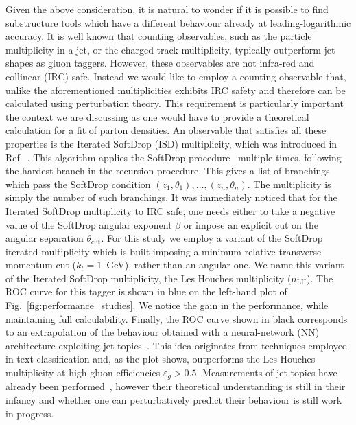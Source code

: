 Given the above consideration, it is natural to wonder if it is possible to find substructure tools
which have a different behaviour already at leading-logarithmic
accuracy.
%
It is well known that counting observables, such as the particle multiplicity in a jet, or the charged-track multiplicity, typically outperform jet shapes as gluon taggers. However, these observables are not infra-red and collinear (IRC) safe. Instead we would like to employ  a counting observable that, unlike the aforementioned multiplicities exhibits IRC safety and therefore can be calculated using perturbation theory. This requirement is particularly important the context we are discussing as one would have to provide a theoretical calculation for a fit of parton densities. 
%
An observable that satisfies all these properties is the Iterated SoftDrop (ISD) multiplicity, which was introduced in Ref.~\cite{Frye:2017yrw}.
%
This algorithm applies the SoftDrop procedure~\cite{Larkoski:2014wba} multiple
times, following the hardest branch in
the recursion procedure. This gives a list of
branchings which pass the SoftDrop condition
$(z_1,\theta_1), \dots, (z_n,\theta_n)$. The multiplicity is simply the number of such branchings.
%
It was immediately noticed that for the Iterated SoftDrop multiplicity to IRC safe, one needs either to take a negative value of the SoftDrop angular exponent $\beta$ or impose an explicit cut on the angular separation  $\theta_\text{cut}$.
%
For this study we employ a variant of the SoftDrop iterated multiplicity which is built imposing a minimum relative transverse momentum cut ($k_t=1$~GeV), rather than an angular one. We name this variant of the Iterated SoftDrop multiplicity, the Les Houches multiplicity ($n_\text{LH}$).
The ROC curve for this tagger is shown in blue on the left-hand plot of  Fig.~\ref{fig:performance_studies}. We notice the gain in the performance, while maintaining full calculability. 
%
Finally, the ROC curve shown in black corresponds to an extrapolation of the behaviour obtained with a neural-network (NN) architecture exploiting jet topics~\cite{Metodiev:2018ftz,Komiske:2018vkc}. This idea originates from techniques employed in text-classification and, as the plot shows, outperforms the Les Houches multiplicity at high gluon efficiencies $\varepsilon_g > 0.5$. Measurements of jet topics have already been performed~\cite{Aad:2019onw}, however their theoretical understanding is still in their infancy and whether one can perturbatively predict their behaviour is still work in progress.

